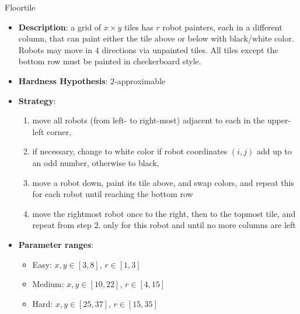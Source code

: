 \documentclass[aspectratio=169,xcolor=dvipsnames]{beamer}
\begin{document}
\begin{frame}{Floortile}

    \begin{itemize}
        \item \textbf{Description}: a grid of $x\times y$ tiles has $r$ robot painters, each in a different column, that can paint either the tile above or below with black/white color. Robots may move in $4$ directions via unpainted tiles. All tiles except the bottom row must be painted in checkerboard style.
        \item \textbf{Hardness Hypothesis}: $2$-approximable  %
        \item \textbf{Strategy}:
        \begin{enumerate}
            \item move all robots (from left- to right-most) adjacent to each in the upper-left corner,
            \item if necessary, change to white color if robot coordinates $(i,j)$ add up to an odd number, otherwise to black,
            \item move a robot down, paint its tile above, and swap colors, and repeat this for each robot until reaching the bottom row
            \item move the rightmost robot once to the right, then to the topmost tile, and repeat from step 2. only for this robot and until no more columns are left
        \end{enumerate}
        \item \textbf{Parameter ranges}:
        \begin{itemize}
            \item Easy: $x,y \in [3,8]$, $r \in [1,3]$
            \item Medium: $x,y \in [10,22]$, $r \in [4,15]$
            \item Hard: $x,y \in [25,37]$, $r \in [15,35]$
        \end{itemize}
    \end{itemize}

\end{frame}
\end{document}
